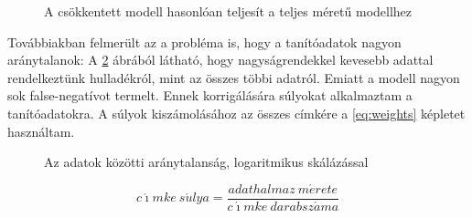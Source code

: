\begin{figure}[H]
	\centering
	\hspace{5pt}
	\hspace{5pt}
	\caption{A csökkentett modell hasonlóan teljesít a teljes méretű modellhez}
	\label{fig:fullsize-vs-reduced}
\end{figure}

Továbbiakban felmerült az a probléma is, hogy a tanítóadatok nagyon aránytalanok: A \ref{fig:unbalanced-data} ábrából látható, hogy nagyságrendekkel kevesebb adattal rendelkeztünk hulladékról, mint az összes többi adatról. Emiatt a modell nagyon sok false-negatívot termelt. Ennek korrigálására súlyokat alkalmaztam a tanítóadatokra. A súlyok kiszámolásához az összes címkére a \ref{eq:weights} képletet használtam.

\datacounts

\begin{figure}
    \caption{Az adatok közötti aránytalanság, logaritmikus skálázással}
    \label{fig:unbalanced-data}
\end{figure}

\begin{equation}\label{eq:weights}
    c\acute{\imath}mke \ s\acute{u}lya=\frac{adathalmaz \ m\acute{e}rete}{c\acute{\imath}mke \ darabsz\acute{a}ma}
\end{equation}

